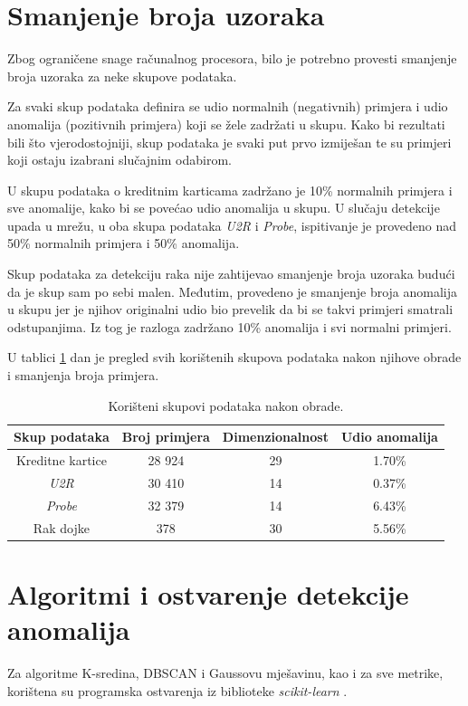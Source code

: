 \documentclass[utf8, diplomski, numeric]{fer}
\begin{document}
\section{Smanjenje broja uzoraka}
Zbog ograničene snage računalnog procesora, bilo je potrebno provesti smanjenje broja uzoraka za neke skupove podataka. 

Za svaki skup podataka definira se udio normalnih (negativnih) primjera i udio anomalija (pozitivnih primjera) koji se žele zadržati u skupu. Kako bi rezultati bili što vjerodostojniji, skup podataka je svaki put prvo izmiješan te su primjeri koji ostaju izabrani slučajnim odabirom. 

U skupu podataka o kreditnim karticama zadržano je 10\% normalnih primjera i sve anomalije, kako bi se povećao udio anomalija u skupu. U slučaju detekcije upada u mrežu, u oba skupa podataka \textit{U2R} i \textit{Probe}, ispitivanje je provedeno nad 50\% normalnih primjera i 50\% anomalija.

Skup podataka za detekciju raka nije zahtijevao smanjenje broja uzoraka budući da je skup sam po sebi malen. Međutim, provedeno je smanjenje broja anomalija u skupu jer je njihov originalni udio bio prevelik da bi se takvi primjeri smatrali odstupanjima. Iz tog je razloga zadržano 10\% anomalija i svi normalni primjeri.

U tablici \ref{tab:datasets2} dan je pregled svih korištenih skupova podataka nakon njihove obrade i smanjenja broja primjera.

\begin{table}[h!]
  \begin{center}
    \caption{Korišteni skupovi podataka nakon obrade.}
    \label{tab:datasets2}
    \begin{tabular}{c|c|c|c} 
      \textbf{Skup podataka} & \textbf{Broj primjera} & \textbf{Dimenzionalnost}  & \textbf{Udio anomalija}\\
      \hline
      Kreditne kartice & 28 924 & 29 & 1.70\% \\
      \textit{U2R} & 30 410 & 14 & 0.37\% \\
      \textit{Probe} & 32 379 & 14 & 6.43\% \\
      Rak dojke & 378 & 30 & 5.56\% \\
     \end{tabular}
  \end{center}
\end{table}

\section{Algoritmi i ostvarenje detekcije anomalija}
Za algoritme K-sredina, DBSCAN i Gaussovu mješavinu, kao i za sve metrike, korištena su programska ostvarenja iz biblioteke \textit{scikit-learn} \cite{scikit-learn}.
\end{document}
